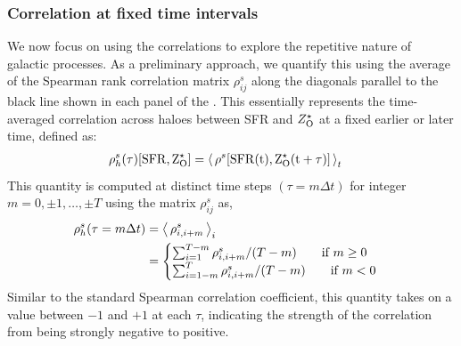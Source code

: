 \subsubsection{Correlation at fixed time intervals}
\label{sec:halhal-corr-sfrZ}
We now focus on using the correlations to explore the repetitive nature of galactic processes. As a preliminary approach, we quantify this using the average of the Spearman rank correlation matrix $\rho^s_{ij}$ along the diagonals parallel to the black line shown in each panel of the . This essentially represents the time-averaged correlation across haloes between SFR and $Z^{\star}_{\rm{O}}$ at a fixed earlier or later time, defined as:
\begin{align}
\rho^s_h(\tau)[\rm{SFR}, Z^{\star}_{\rm{O}}] &= \left\langle \, \rho^s [ \rm{SFR}(t), Z^{\star}_{\rm{O}}(t+\tau)] \, \right\rangle_{t}  
\end{align}
This quantity is computed at distinct time steps $(\tau=m \Delta t)$ for integer $m = 0,\pm 1,\ldots,\pm T$ using the matrix $\rho^s_{ij}$ as,
\begin{align}
\label{eq:def-hal-correl}
\rho^s_h(\tau = m \Delta t) 
&= \left\langle \, \rho^s_{i,i+m} \, \right\rangle_i \\
&= \begin{cases}
\sum_{i=1}^{T-m} \rho^s_{i,i+m}/(T-m) \qquad \text{if } m \geq 0 \\
\sum_{i=1-m}^{T} \rho^s_{i,i+m}/(T-m) \qquad \text{if } m < 0
\end{cases}
\end{align}
Similar to the standard Spearman correlation coefficient, this quantity takes on a value between $-1$ and $+1$ at each $\tau$, indicating the strength of the correlation from being strongly negative to positive.
